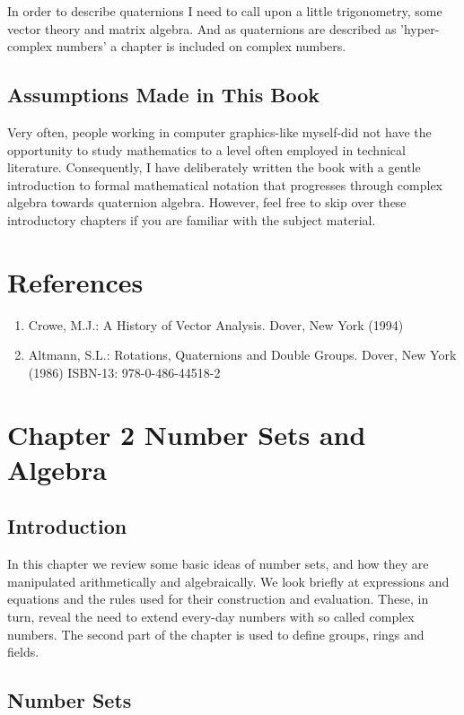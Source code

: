 \documentclass[10pt]{article}
\begin{document}
In order to describe quaternions I need to call upon a little trigonometry, some vector theory and matrix algebra. And as quaternions are described as 'hyper-complex numbers' a chapter is included on complex numbers.

\subsection{Assumptions Made in This Book}
Very often, people working in computer graphics-like myself-did not have the opportunity to study mathematics to a level often employed in technical literature. Consequently, I have deliberately written the book with a gentle introduction to formal mathematical notation that progresses through complex algebra towards quaternion algebra. However, feel free to skip over these introductory chapters if you are familiar with the subject material.

\section{References}
\begin{enumerate}
  \item Crowe, M.J.: A History of Vector Analysis. Dover, New York (1994)

  \item Altmann, S.L.: Rotations, Quaternions and Double Groups. Dover, New York (1986) ISBN-13: 978-0-486-44518-2

\end{enumerate}

\section{Chapter 2
Number Sets and Algebra}
\subsection{Introduction}
In this chapter we review some basic ideas of number sets, and how they are manipulated arithmetically and algebraically. We look briefly at expressions and equations and the rules used for their construction and evaluation. These, in turn, reveal the need to extend every-day numbers with so called complex numbers. The second part of the chapter is used to define groups, rings and fields.

\subsection{Number Sets}
\end{document}
